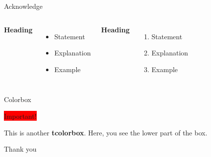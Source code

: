 \documentclass[aspectratio=169,xcolor=dvipsnames]{beamer}
\begin{document}
\begin{frame}{Acknowledge}
	\begin{columns}[c] %
		
		\textbf{Heading}
		\begin{itemize}
			\item Statement
			\item Explanation
			\item Example
		\end{itemize}
		
		\textbf{Heading}
			\begin{enumerate}
			\item Statement
			\item Explanation
			\item Example
		\end{enumerate}
		
	\end{columns}
\end{frame}
\begin{frame}{Colorbox}
	\begin{center}
		\colorbox{red}{Important!}
	\end{center}
	\begin{tcolorbox}[colback=red!5!white,colframe=red!75!black,title=My  nice  heading]
		This  is  another  \textbf{tcolorbox}.
		\tcblower
		Here,  you  see  the  lower  part  of  the  box.
	\end{tcolorbox}
\end{frame}
\begin{frame}{Thank you}

   \center \Huge{{\textbf{\color{MidnightBlue}{Thank you for your attention }}}}
   


\begin{center}
		\faLinode
\end{center}



\end{frame}


\end{document}
